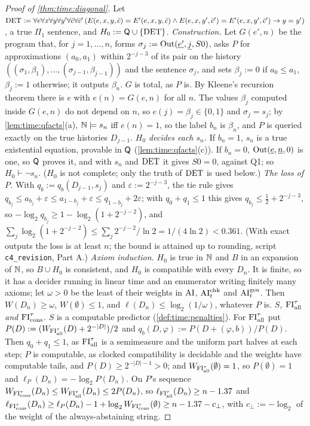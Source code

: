 \begin{proof}[Proof of \cref{thm:time:diagonal}]
Let $\mathrm{DET}:=\forall e\forall x\forall y\forall y'\forall\bar c\forall\bar c'\,(E(e,x,y,\bar c)=E'(e,x,y,\bar c)\wedge E(e,x,y',\bar c')=E'(e,x,y',\bar c')\to y=y')$, a true $\Pi_1$ sentence, and $H_0:=\mathsf{Q}\cup\{\mathrm{DET}\}$.
\emph{Construction.} Let $G(e',n)$ be the program that, for $j=1,\dots,n$, forms $\sigma_j:=\mathrm{Out}(\underline{e'},\underline{j},S0)$, asks $P$ for approximations $(a_0,a_1)$ within $2^{-j-3}$ of its pair on the history $((\sigma_1,\beta_1),\dots,(\sigma_{j-1},\beta_{j-1}))$ and the sentence $\sigma_j$, and sets $\beta_j:=0$ if $a_0\le a_1$, $\beta_j:=1$ otherwise; it outputs $\beta_n$. $G$ is total, as $P$ is. By Kleene's recursion theorem \citep[\S11.2; section not checked]{rogers1967theory} there is $e$ with $e(n)=G(e,n)$ for all $n$. The values $\beta_j$ computed inside $G(e,n)$ do not depend on $n$, so $e(j)=\beta_j\in\{0,1\}$ and $\sigma_j=s_j$; by \cref{lem:time:qfacts}(a), $\mathbb{N}\models s_n$ iff $e(n)=1$, so the label $b_n$ is $\beta_n$, and $P$ is queried exactly on the true histories $D_{j-1}$.
\emph{$H_0$ decides each $s_n$.} If $b_n=1$, $s_n$ is a true existential equation, provable in $\mathsf{Q}$ (\cref{lem:time:qfacts}(c)). If $b_n=0$, $\mathrm{Out}(\underline{e},\underline{n},0)$ is one, so $\mathsf{Q}$ proves it, and with $s_n$ and $\mathrm{DET}$ it gives $S0=0$, against Q1; so $H_0\vdash\neg s_n$. ($H_0$ is not complete; only the truth of $\mathrm{DET}$ is used below.)
\emph{The loss of $P$.} With $q_b:=q_b(D_{j-1},s_j)$ and $\varepsilon:=2^{-j-3}$, the tie rule gives $q_{b_j}\le a_{b_j}+\varepsilon\le a_{1-b_j}+\varepsilon\le q_{1-b_j}+2\varepsilon$; with $q_0+q_1\le1$ this gives $q_{b_j}\le\frac12+2^{-j-3}$, so $-\log_2q_{b_j}\ge1-\log_2(1+2^{-j-2})$, and $\sum_j\log_2(1+2^{-j-2})\le\sum_j2^{-j-2}/\ln2=1/(4\ln2)<0.361$. (With exact outputs the loss is at least $n$; the bound is attained up to rounding, script \texttt{c4\_revision}, Part A.)
\emph{Axiom induction.} $H_0$ is true in $\mathbb{N}$ and $B$ in an expansion of $\mathbb{N}$, so $B\cup H_0$ is consistent, and $H_0$ is compatible with every $D_n$. It is finite, so it has a decider running in linear time and an enumerator writing finitely many axioms; let $\omega>0$ be the least of their weights in $\mathrm{AI}$, $\mathrm{AI}^{\mathrm{chk}}_t$ and $\mathrm{AI}^{\mathrm{gen}}_t$. Then $W(D_n)\ge\omega$, $W(\emptyset)\le1$, and $\ell(D_n)\le\log_2(1/\omega)$, whatever $P$ is.
\emph{$S$, $\mathrm{FI}_{\mathrm{all}}^\tau$ and $\mathrm{FI}_{\mathrm{cons}}^\tau$.} $S$ is a computable predictor (\cref{def:time:penalties}). For $\mathrm{FI}_{\mathrm{all}}^\tau$ put $P(D):=(W_{\mathrm{FI}_{\mathrm{all}}^\tau}(D)+2^{-|D|})/2$ and $q_b(D,\varphi):=P(D+(\varphi,b))/P(D)$. Then $q_0+q_1\le1$, as $\mathrm{FI}_{\mathrm{all}}^\tau$ is a semimeasure and the uniform part halves at each step; $P$ is computable, as clocked compatibility is decidable and the weights have computable tails, and $P(D)\ge2^{-|D|-1}>0$; and $W_{\mathrm{FI}_{\mathrm{all}}^\tau}(\emptyset)=1$, so $P(\emptyset)=1$ and $\ell_P(D_n)=-\log_2P(D_n)$. On $P$'s sequence $W_{\mathrm{FI}_{\mathrm{cons}}^\tau}(D_n)\le W_{\mathrm{FI}_{\mathrm{all}}^\tau}(D_n)\le2P(D_n)$, so $\ell_{\mathrm{FI}_{\mathrm{all}}^\tau}(D_n)\ge n-1.37$ and $\ell_{\mathrm{FI}_{\mathrm{cons}}^\tau}(D_n)\ge\ell_P(D_n)-1+\log_2W_{\mathrm{FI}_{\mathrm{cons}}^\tau}(\emptyset)\ge n-1.37-c_\perp$, with $c_\perp:=-\log_2$ of the weight of the always-abstaining string.

\end{proof}
